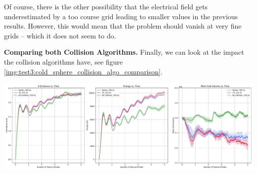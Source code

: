 Of course, there is the other possibility that the electrical field gets underestimated by a too course grid leading to smaller values in the previous results. However, this would mean that the problem should vanish at very fine grids -- which it does not seem to do.

\textbf{Comparing both Collision Algorithms.} Finally, we can look at the impact the collision algorithms have, see figure \ref{img:test3:cold_sphere_collision_algo_comparison}. \\
\begin{minipage}[h]{\linewidth}
    \vspace{5pt}
    \centering
    \includegraphics[width=\linewidth]{ressources/test3/cold_sphere_collision_algo_comparison.pdf}
    \label{img:test3:cold_sphere_collision_algo_comparison}
    \vspace{5pt}
\end{minipage}
